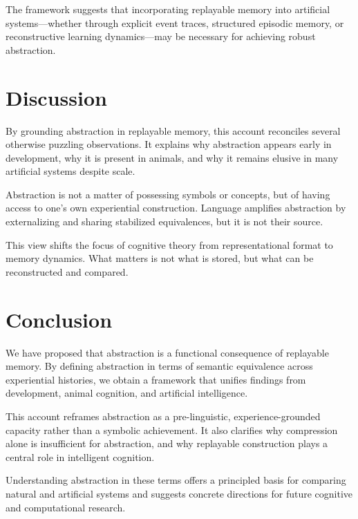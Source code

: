 \documentclass[11pt]{article}
\begin{document}
The framework suggests that incorporating replayable memory into artificial systems—whether through explicit event traces, structured episodic memory, or reconstructive learning dynamics—may be necessary for achieving robust abstraction.

\section{Discussion}

By grounding abstraction in replayable memory, this account reconciles several otherwise puzzling observations. It explains why abstraction appears early in development, why it is present in animals, and why it remains elusive in many artificial systems despite scale.

Abstraction is not a matter of possessing symbols or concepts, but of having access to one's own experiential construction. Language amplifies abstraction by externalizing and sharing stabilized equivalences, but it is not their source.

This view shifts the focus of cognitive theory from representational format to memory dynamics. What matters is not what is stored, but what can be reconstructed and compared.

\section{Conclusion}

We have proposed that abstraction is a functional consequence of replayable memory. By defining abstraction in terms of semantic equivalence across experiential histories, we obtain a framework that unifies findings from development, animal cognition, and artificial intelligence.

This account reframes abstraction as a pre-linguistic, experience-grounded capacity rather than a symbolic achievement. It also clarifies why compression alone is insufficient for abstraction, and why replayable construction plays a central role in intelligent cognition.

Understanding abstraction in these terms offers a principled basis for comparing natural and artificial systems and suggests concrete directions for future cognitive and computational research.
\end{document}
